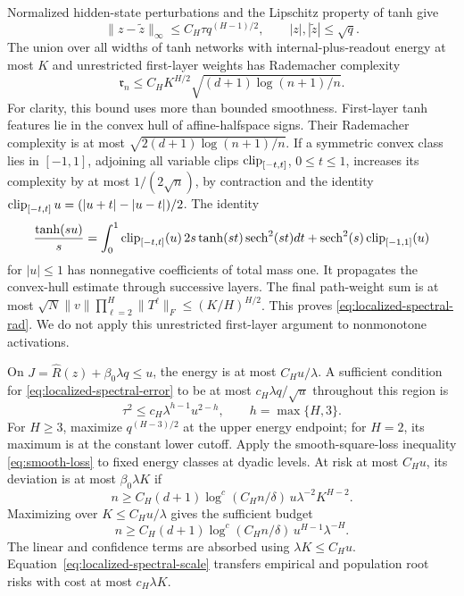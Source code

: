 Normalized hidden-state perturbations and the Lipschitz property of tanh give
\begin{equation}
 \|z-\widetilde z\|_\infty\le C_H\tau q^{(H-1)/2},
 \qquad |z|,|\widetilde z|\le\sqrt q.
 \label{eq:localized-spectral-error}
\end{equation}
The union over all widths of tanh networks with internal-plus-readout energy at most $K$ and unrestricted first-layer weights has Rademacher complexity
\begin{equation}
 \mathfrak r_n\le C_HK^{H/2}\sqrt{(d+1)\log(n+1)/n}.
 \label{eq:localized-spectral-rad}
\end{equation}
For clarity, this bound uses more than bounded smoothness. First-layer tanh features lie in the convex hull of affine-halfspace signs. Their Rademacher complexity is at most $\sqrt{2(d+1)\log(n+1)/n}$. If a symmetric convex class lies in $[-1,1]$, adjoining all variable clips $\operatorname{clip}_{[-t,t]}$, $0\le t\le1$, increases its complexity by at most $1/(2\sqrt n)$, by contraction and the identity $\operatorname{clip}_{[-t,t]}u=(|u+t|-|u-t|)/2$. The identity
\[
 \frac{\tanh(su)}s=
 \int_0^1\operatorname{clip}_{[-t,t]}(u)\,2s\tanh(st)\operatorname{sech}^2(st)dt
 +\operatorname{sech}^2(s)\operatorname{clip}_{[-1,1]}(u)
\]
for $|u|\le1$ has nonnegative coefficients of total mass one. It propagates the convex-hull estimate through successive layers. The final path-weight sum is at most
$\sqrt N\|v\|\prod_{\ell=2}^H\|T^\ell\|_F\le(K/H)^{H/2}$.
This proves \eqref{eq:localized-spectral-rad}. We do not apply this unrestricted first-layer argument to nonmonotone activations.

On $J=\widehat R(z)+\beta_0\lambda q\le u$, the energy is at most $C_Hu/\lambda$. A sufficient condition for \eqref{eq:localized-spectral-error} to be at most $c_H\lambda q/\sqrt u$ throughout this region is
\begin{equation}
 \tau^2\le c_H\lambda^{h-1}u^{2-h},\qquad h=\max\{H,3\}.
 \label{eq:localized-spectral-scale}
\end{equation}
For $H\ge3$, maximize $q^{(H-3)/2}$ at the upper energy endpoint; for $H=2$, its maximum is at the constant lower cutoff. Apply the smooth-square-loss inequality \eqref{eq:smooth-loss} to fixed energy classes at dyadic levels. At risk at most $C_Hu$, its deviation is at most $\beta_0\lambda K$ if
\[
 n\ge C_H(d+1)\log^c(C_Hn/\delta)\,
                  u\lambda^{-2}K^{H-2}.
\]
Maximizing over $K\le C_Hu/\lambda$ gives the sufficient budget
\begin{equation}
 n\ge C_H(d+1)\log^c(C_Hn/\delta)\,
                    u^{H-1}\lambda^{-H}.
 \label{eq:localized-spectral-budget}
\end{equation}
The linear and confidence terms are absorbed using $\lambda K\le C_Hu$. Equation~\eqref{eq:localized-spectral-scale} transfers empirical and population root risks with cost at most $c_H\lambda K$.

